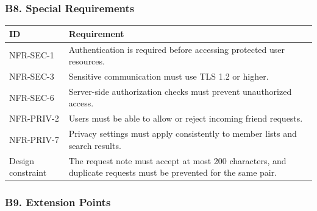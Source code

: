 \documentclass[12pt]{article}
\renewcommand{\baselinestretch}{1.5}
\begin{document}
\hypertarget{sec:b8-special-requirements}{}
\subsubsection*{B8. Special Requirements}
\par\medskip

\begingroup
\small
\renewcommand{\baselinestretch}{1.0}\selectfont
\renewcommand{\arraystretch}{1.15}
\setlength{\tabcolsep}{6pt}
\begin{longtable}{|>{\raggedright\arraybackslash}p{}|>{\raggedright\arraybackslash}p{}|}
\hline
\textbf{ID} & \textbf{Requirement} \\ \hline
\endhead
NFR-SEC-1 & Authentication is required before accessing protected user resources. \\ \hline
NFR-SEC-3 & Sensitive communication must use TLS 1.2 or higher. \\ \hline
NFR-SEC-6 & Server-side authorization checks must prevent unauthorized access. \\ \hline
NFR-PRIV-2 & Users must be able to allow or reject incoming friend requests. \\ \hline
NFR-PRIV-7 & Privacy settings must apply consistently to member lists and search results. \\ \hline
Design constraint & The request note must accept at most 200 characters, and duplicate requests must be prevented for the same pair. \\ \hline
\end{longtable}
\endgroup
\par\medskip

\hypertarget{sec:b9-extension-points}{}
\subsubsection*{B9. Extension Points}
\par\medskip
\end{document}
